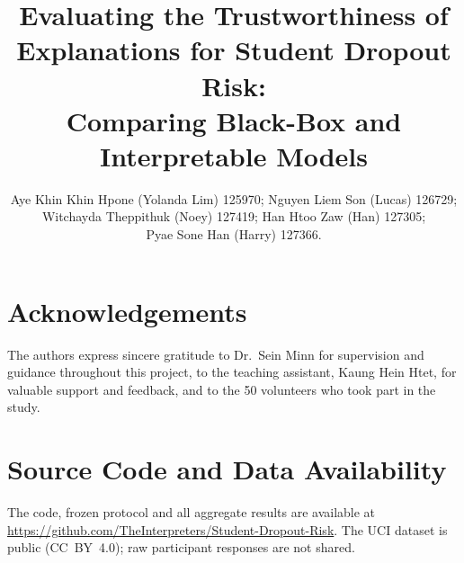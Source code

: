 \documentclass[10pt,twocolumn,letterpaper]{article}
\title{Evaluating the Trustworthiness of Explanations for Student Dropout Risk:\\
Comparing Black-Box and Interpretable Models}
\author{
Aye Khin Khin Hpone (Yolanda Lim) 125970; \quad Nguyen Liem Son (Lucas) 126729;\\
Witchayda Theppithuk (Noey) 127419; \quad Han Htoo Zaw (Han) 127305;\\
Pyae Sone Han (Harry) 127366.
}
\begin{document}
\maketitle










\section*{Acknowledgements}
The authors express sincere gratitude to Dr.\ Sein Minn for supervision and guidance throughout
this project, to the teaching assistant, Kaung Hein Htet, for valuable support and feedback, and to
the 50 volunteers who took part in the study.

\section*{Source Code and Data Availability}
The code, frozen protocol and all aggregate results are available at
\href{https://github.com/TheInterpreters/Student-Dropout-Risk}{https://github.com/TheInterpreters/Student-Dropout-Risk}.
The UCI dataset is public (CC~BY~4.0); raw participant responses are not shared.

{\small


}


\end{document}
